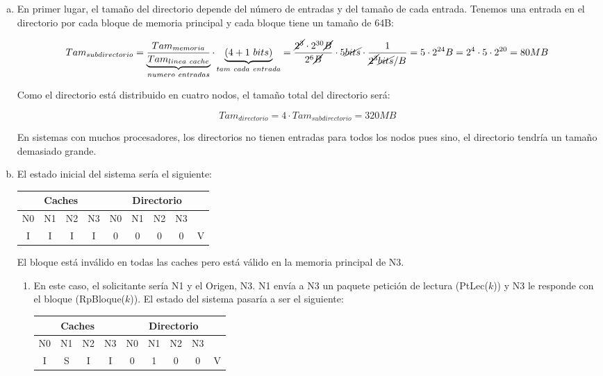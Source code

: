\documentclass[10pt,a4paper,spanish]{report}
\begin{document}
\begin{enumerate}[a)]
\item
En primer lugar, el tamaño del directorio depende del número de entradas y del tamaño de cada entrada. Tenemos una entrada en el directorio por cada bloque de memoria principal y cada bloque tiene un tamaño de 64B:

\begin{displaymath}
Tam_{subdirectorio} = \underbrace{\frac{Tam_{memoria}}{Tam_{linea~cache}}}_{numero~entradas} \cdot \underbrace{(4+1~bits)}_{tam~cada~entrada} = \frac{\cancel{2^3} \cdot 2^{30} \cancel{B}}{2^6 \cancel{B}} \cdot 5 \cancel{bits} \cdot \frac{1}{\cancel{2^3} \cancel{bits}/B} = 5 \cdot 2^{24} B = 2^4 \cdot 5 \cdot 2^{20} = 80MB
\end{displaymath}

Como el directorio está distribuido en cuatro nodos, el tamaño total del directorio será:

\begin{displaymath}
Tam_{directorio} = 4 \cdot Tam_{subdirectorio} = 320MB
\end{displaymath}

En sistemas con muchos procesadores, los directorios no tienen entradas para todos los nodos pues sino, el directorio tendría un tamaño demasiado grande.

\item
El estado inicial del sistema sería el siguiente:

\begin{center}
\begin{tabular}{|c|c|c|c|c|c|c|c|c|}
\hline
\multicolumn{4}{|c|}{Caches} & \multicolumn{5}{|c|}{Directorio} \\
\hline
N0 & N1 & N2 & N3 & N0 & N1 & N2 & N3 & \\
\hline
I & I & I & I & 0 & 0 & 0 & 0 & V \\
\hline
\end{tabular}
\end{center}

El bloque está inválido en todas las caches pero está válido en la memoria principal de N3.

\begin{enumerate}[1.]
    \item En este caso, el solicitante sería N1 y el Origen, N3. N1 envía a N3 un paquete petición de lectura (PtLec($k$)) y N3 le responde con el bloque (RpBloque($k$)). El estado del sistema pasaría a ser el siguiente:

    \begin{center}
    \begin{tabular}{|c|c|c|c|c|c|c|c|c|}
    \hline
    \multicolumn{4}{|c|}{Caches} & \multicolumn{5}{|c|}{Directorio} \\
    \hline
    N0 & N1 & N2 & N3 & N0 & N1 & N2 & N3 & \\
    \hline
    I & S & I & I & 0 & 1 & 0 & 0 & V \\
    \hline
    \end{tabular}
    \end{center}


\end{enumerate}
\end{enumerate}
\end{document}
